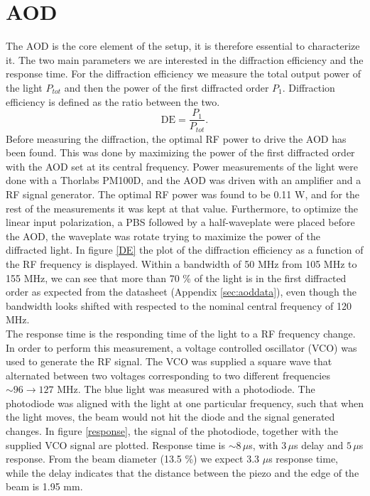 \section{AOD}
\label{sec:resultaod}
The AOD is the core element of the setup, it is therefore essential to characterize it. The two main parameters we are interested in the diffraction efficiency and the response time. For the diffraction efficiency we measure the total output power of the light $P_{tot}$ and then the power of the first diffracted order $P_{1}$. Diffraction efficiency is defined as the ratio between the two.
\begin{equation}
\text{DE} = \frac{P_1}{P_{tot}}.
\end{equation}
Before measuring the diffraction, the optimal RF power to drive the AOD has been found. This was done by maximizing the power of the first diffracted order with the AOD set at its central frequency. Power measurements of the light were done with a Thorlabs PM100D, and the AOD was driven with an amplifier and a RF signal generator. The optimal RF power was found to be 0.11 W, and for the rest of the measurements it was kept at that value. Furthermore, to optimize the linear input polarization, a PBS followed by a half-waveplate were placed before the AOD, the waveplate was rotate trying to maximize the power of the diffracted light. In figure \ref{DE} the plot of the diffraction efficiency as a function of the RF frequency is displayed. Within a bandwidth of 50 MHz from 105 MHz to 155 MHz, we can see that more than 70 \% of the light is in the first diffracted order as expected from the datasheet (Appendix \ref{sec:aoddata}), even though the bandwidth looks shifted with respected to the nominal central frequency of 120 MHz.\\
The response time is the responding time of the light to a RF frequency change. In order to perform this measurement, a voltage controlled oscillator (VCO) was used to generate the RF signal. The VCO was supplied a square wave that alternated between two voltages corresponding to two different frequencies $\sim 96 \to 127$ MHz. The blue light was measured with a photodiode. The photodiode was aligned with the light at one particular frequency, such that when the light moves, the beam would not hit the diode and the signal generated changes. In figure \ref{response}, the signal of the photodiode, together with the supplied VCO signal are plotted. Response time is $\sim 8\,\mu$s, with $3\,\mu$s delay and $5\,\mu$s response. From the beam diameter (13.5 \%) we expect 3.3 $\mu$s response time, while the delay indicates that the distance between the piezo and the edge of the beam is 1.95 mm.

